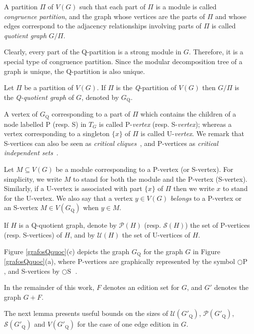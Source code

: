 \documentclass[12pt]{article}
\begin{document}
A partition $\Pi$ of $V(G)$ such that each part of $\Pi$ is a
module is called \emph{congruence partition}, and the graph whose
vertices are the parts of $\Pi$ and whose edges correspond to the
adjacency relationships involving parts of $\Pi$ is called
\emph{quotient graph} $G/\Pi$.

Clearly, every part of the Q-partition is a strong module in $G$.
Therefore, it is a special type of congruence partition. Since the
modular decomposition tree of a graph is unique, the Q-partition
is also unique.

\begin{defin}
Let $\Pi$ be a partition of $V(G)$. If $\Pi$ is the
\emph{Q}-partition of $V(G)$ then $G/\Pi$ is the \emph{Q-quotient
graph} of $G$, denoted by $G_{\mathrm Q}$.
\end{defin}

A vertex of $G_{\mathrm Q}$ corresponding to a part of $\Pi$ which
contains the children of a node labelled P (resp. S) in $T_G$ is
called P-\emph{vertex} (resp. S-\emph{vertex}); whereas a vertex
corresponding to a singleton $\{x\}$ of $\Pi$ is called
U-\emph{vertex}. We remark that S-vertices can also be seen as
{\em critical cliques}~\cite{G2007}, and P-vertices as {\em
critical independent sets}~\cite{YZ2007}.

Let $M \subseteq V(G)$ be a module corresponding to a P-vertex (or S-vertex).
For simplicity, we write $M$ to stand for both the
module and the P-vertex (S-vertex). Similarly, if a U-vertex is associated with
part $\{x\}$  of $\Pi$ then we write $x$ to stand
for the U-vertex. We also say that a vertex $y \in V(G)$  {\em
belongs} to a P-vertex or an S-vertex $M \in V(G_{\mathrm Q})$ when
$y \in M$.

If $H$ is a Q-quotient graph, denote by ${\mathcal P}(H)$ (resp.
${\mathcal S}(H)$) the set of P-vertices (resp. S-vertices) of
$H$, and by ${\mathcal U}(H)$ the set of U-vertices of $H$.

Figure \ref{grafosQquoc}(c) depicts the graph $G_{\mathrm Q}$ for
the graph $G$ in Figure \ref{grafosQquoc}(a), where P-vertices are
graphically represented by the symbol
\mbox{$\bigcirc$\hspace{-.105in}\scriptsize{P}} \normalsize, and
S-vertices by \mbox{$\bigcirc$\hspace{-.10in}\scriptsize{S}$\;$}
\normalsize.

In the remainder of this work, $F$ denotes an edition set for $G$, and $G'$ denotes the graph $G+F$.

The next lemma presents useful bounds on the sizes of ${\mathcal U}(G'_{\mathrm Q})$,
${\mathcal P}(G'_{\mathrm Q})$, ${\mathcal S}(G'_{\mathrm Q})$ and $V(G'_{\mathrm Q})$
for the case of one edge edition in $G$.
\end{document}
